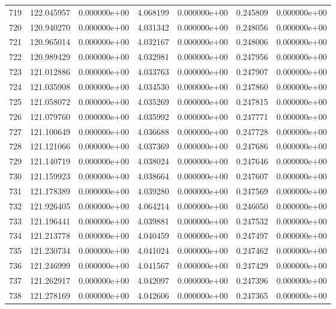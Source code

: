 \begin{tabular}{rrrrrrr}
 719 & 122.045957 &  0.000000e+00 &  4.068199 &  0.000000e+00 &    0.245809 &  0.000000e+00 \\
 720 & 120.940270 &  0.000000e+00 &  4.031342 &  0.000000e+00 &    0.248056 &  0.000000e+00 \\
 721 & 120.965014 &  0.000000e+00 &  4.032167 &  0.000000e+00 &    0.248006 &  0.000000e+00 \\
 722 & 120.989429 &  0.000000e+00 &  4.032981 &  0.000000e+00 &    0.247956 &  0.000000e+00 \\
 723 & 121.012886 &  0.000000e+00 &  4.033763 &  0.000000e+00 &    0.247907 &  0.000000e+00 \\
 724 & 121.035908 &  0.000000e+00 &  4.034530 &  0.000000e+00 &    0.247860 &  0.000000e+00 \\
 725 & 121.058072 &  0.000000e+00 &  4.035269 &  0.000000e+00 &    0.247815 &  0.000000e+00 \\
 726 & 121.079760 &  0.000000e+00 &  4.035992 &  0.000000e+00 &    0.247771 &  0.000000e+00 \\
 727 & 121.100649 &  0.000000e+00 &  4.036688 &  0.000000e+00 &    0.247728 &  0.000000e+00 \\
 728 & 121.121066 &  0.000000e+00 &  4.037369 &  0.000000e+00 &    0.247686 &  0.000000e+00 \\
 729 & 121.140719 &  0.000000e+00 &  4.038024 &  0.000000e+00 &    0.247646 &  0.000000e+00 \\
 730 & 121.159923 &  0.000000e+00 &  4.038664 &  0.000000e+00 &    0.247607 &  0.000000e+00 \\
 731 & 121.178389 &  0.000000e+00 &  4.039280 &  0.000000e+00 &    0.247569 &  0.000000e+00 \\
 732 & 121.926405 &  0.000000e+00 &  4.064214 &  0.000000e+00 &    0.246050 &  0.000000e+00 \\
 733 & 121.196441 &  0.000000e+00 &  4.039881 &  0.000000e+00 &    0.247532 &  0.000000e+00 \\
 734 & 121.213778 &  0.000000e+00 &  4.040459 &  0.000000e+00 &    0.247497 &  0.000000e+00 \\
 735 & 121.230734 &  0.000000e+00 &  4.041024 &  0.000000e+00 &    0.247462 &  0.000000e+00 \\
 736 & 121.246999 &  0.000000e+00 &  4.041567 &  0.000000e+00 &    0.247429 &  0.000000e+00 \\
 737 & 121.262917 &  0.000000e+00 &  4.042097 &  0.000000e+00 &    0.247396 &  0.000000e+00 \\
 738 & 121.278169 &  0.000000e+00 &  4.042606 &  0.000000e+00 &    0.247365 &  0.000000e+00 \\

\end{tabular}
